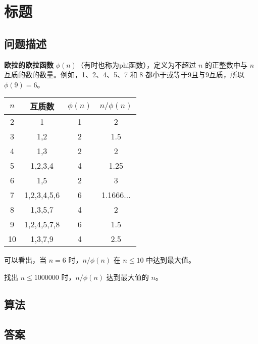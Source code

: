 \section{标题}
\subsection{问题描述}
\begin{tcolorbox}
	\textbf{欧拉的欧拉函数} \(\phi(n)\)（有时也称为phi函数），定义为不超过 \(n\) 的正整数中与 \(n\) 互质的数的数量。例如，1、2、4、5、7 和 8 都小于或等于9且与9互质，所以 \(\phi(9)=6\)。

	\begin{center}
		\begin{tabular}{|c|c|c|c|}
			\hline
			\(n\) & 互质数      & \(\phi(n)\) & \(n/\phi(n)\) \\
			\hline
			2     & 1           & 1           & 2             \\
			3     & 1,2         & 2           & 1.5           \\
			4     & 1,3         & 2           & 2             \\
			5     & 1,2,3,4     & 4           & 1.25          \\
			6     & 1,5         & 2           & 3             \\
			7     & 1,2,3,4,5,6 & 6           & 1.1666...     \\
			8     & 1,3,5,7     & 4           & 2             \\
			9     & 1,2,4,5,7,8 & 6           & 1.5           \\
			10    & 1,3,7,9     & 4           & 2.5           \\
			\hline
		\end{tabular}
	\end{center}

	可以看出，当 \(n=6\) 时，\(n/\phi(n)\) 在 \(n \leq 10\) 中达到最大值。

	找出 \(n \leq 1000000\) 时，\(n/\phi(n)\) 达到最大值的 \(n\)。
\end{tcolorbox}

\subsection{算法}

\subsection{答案}
